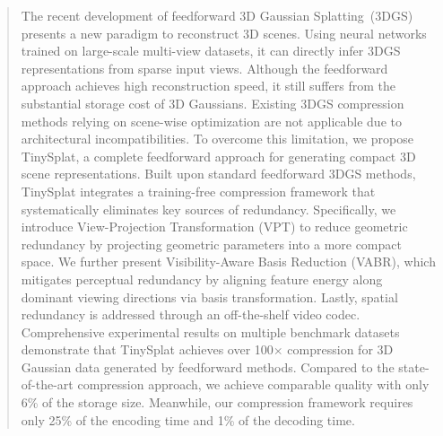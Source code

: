 \documentclass[lettersize,journal]{IEEEtran}
\begin{document}
\maketitle

\begin{abstract}
The recent development of feedforward 3D Gaussian Splatting~(3DGS) presents a new paradigm to reconstruct 3D scenes. Using neural networks trained on large-scale multi-view datasets, it can directly infer 3DGS representations from sparse input views. Although the feedforward approach achieves high reconstruction speed, it still suffers from the substantial storage cost of 3D Gaussians. Existing 3DGS compression methods relying on scene-wise optimization are not applicable due to architectural incompatibilities.
%
To overcome this limitation, we propose TinySplat, a complete feedforward approach for generating compact 3D scene representations. Built upon standard feedforward 3DGS methods, TinySplat integrates a training-free compression framework that systematically eliminates key sources of redundancy. Specifically, we introduce View-Projection Transformation (VPT) to reduce geometric redundancy by projecting geometric parameters into a more compact space. We further present Visibility-Aware Basis Reduction (VABR), which mitigates perceptual redundancy by aligning feature energy along dominant viewing directions via basis transformation. Lastly, spatial redundancy is addressed through an off-the-shelf video codec.
Comprehensive experimental results on multiple benchmark datasets demonstrate that TinySplat achieves over 100$\times$ compression for 3D Gaussian data generated by feedforward methods. Compared to the state-of-the-art compression approach, we achieve comparable quality with only 6\% of the storage size. Meanwhile, our compression framework requires only 25\% of the encoding time and 1\% of the decoding time.


\end{abstract}
\end{document}

